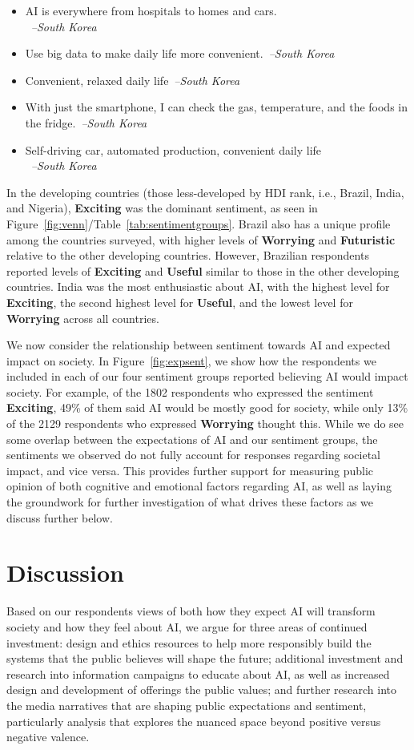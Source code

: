 \documentclass[sigconf]{acmart}
\newcommand\aff[1]{\textcolor{darkplum}{{\emph{--#1}}}}
\newenvironment{lq2}
{ \begin{itemize}[leftmargin = 2.0em, rightmargin=1.0em, label={}]
    \fontsize{8.3pt}{8.9pt}\selectfont
\setlength{\itemsep}{3pt}
    \setlength{\parskip}{3pt}
    \setlength{\parsep}{3pt}     }
{ \end{itemize}                  }
\def\Exciting/{{\fontfamily{lmss}\selectfont\textbf{Exciting}}}  \def\Useful/{{\fontfamily{lmss}\selectfont\textbf{Useful}}}
\def\Worrying/{{\fontfamily{lmss}\selectfont\textbf{Worrying}}}
\def\Futuristic/{{\fontfamily{lmss}\selectfont\textbf{Futuristic}}}
\begin{document}
\begin{lq2}
\item AI is everywhere from hospitals to homes and cars.\\~\aff{South Korea}
\item Use big data to make daily life more convenient.~\aff{South Korea}
\item Convenient, relaxed daily life~\aff{South Korea}
\item With just the smartphone, I can check the gas, temperature, and the foods in the fridge.~\aff{South Korea}
\item Self-driving car, automated production, convenient daily life\\~\aff{South Korea}
\end{lq2}

In the developing countries (those less-developed by HDI rank, i.e., Brazil, India, and Nigeria), \Exciting/ was the dominant sentiment, as seen in Figure~\ref{fig:venn}/Table~\ref{tab:sentimentgroups}. 
Brazil also has a unique profile among the countries surveyed, with higher levels of \Worrying/ and \Futuristic/ relative to the other developing countries. However, Brazilian respondents reported levels of \Exciting/ and \Useful/ similar to those in the other developing countries.
India was the most enthusiastic about AI, with the highest level for \Exciting/, the second highest level for \Useful/, and the lowest level for \Worrying/ across all countries. 

We now consider the relationship between sentiment towards AI and expected impact on society. In Figure~\ref{fig:expsent}, we show how the respondents we included in each of our four sentiment groups reported believing AI would impact society. For example, of the 1802 respondents who expressed the sentiment \Exciting/, 49\% of them said AI would be mostly good for society, while only 13\% of the 2129 respondents who expressed \Worrying/ thought this. While we do see some overlap between the expectations of AI and our sentiment groups, the sentiments we observed do not fully account for responses regarding societal impact, and vice versa. This provides further support for measuring public opinion of both cognitive and emotional factors regarding AI, as well as laying the groundwork for further investigation of what drives these factors as we discuss further below. 
\section{Discussion}
Based on our respondents views of both how they expect AI will transform society and how they feel about AI, we argue for three areas of continued investment: design and ethics resources to help more responsibly build the systems that the public believes will shape the future; additional investment and research into information campaigns to educate about AI, as well as increased design and development of offerings the public values; and further research into the media narratives that are shaping public expectations and sentiment, particularly analysis that explores the nuanced space beyond positive versus negative valence.
\end{document}
